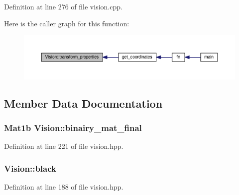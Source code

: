 Definition at line 276 of file vision.\+cpp.



Here is the caller graph for this function\+:\nopagebreak
\begin{figure}[H]
\begin{center}
\leavevmode
\includegraphics[width=350pt]{class_vision_acd6cf5d0e7bba1adfb6f123d76489a6d_icgraph}
\end{center}
\end{figure}




\subsection{Member Data Documentation}
\subsubsection[{\texorpdfstring{binairy\+\_\+mat\+\_\+final}{binairy_mat_final}}]{\setlength{\rightskip}{0pt plus 5cm}Mat1b Vision\+::binairy\+\_\+mat\+\_\+final\hspace{0.3cm}{\ttfamily [private]}}\hypertarget{class_vision_a6509080d46e25f85776c843c08ef4f76}{}\label{class_vision_a6509080d46e25f85776c843c08ef4f76}


Definition at line 221 of file vision.\+hpp.

\subsubsection[{\texorpdfstring{black}{black}}]{ Vision\+::black\hspace{0.3cm}{\ttfamily [private]}}\hypertarget{class_vision_adc52ed0340e54fb14c8a3f397ec0bbc0}{}\label{class_vision_adc52ed0340e54fb14c8a3f397ec0bbc0}


Definition at line 188 of file vision.\+hpp.

